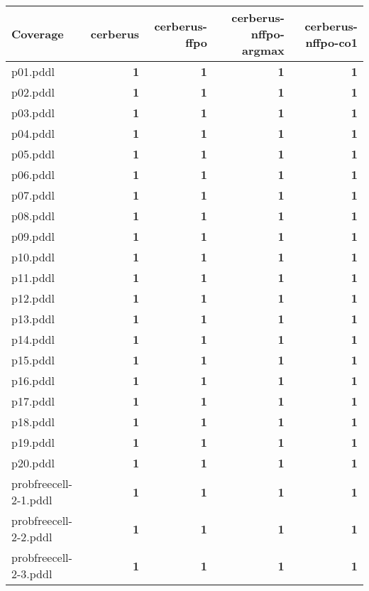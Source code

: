 \documentclass{article}
\begin{document}
\begin{tabular}{@{}lrrrr@{}}
Coverage & cerberus & cerberus-ffpo & cerberus-nffpo-argmax & cerberus-nffpo-co1 \\
\midrule
p01.pddl & \textbf{1} & \textbf{1} & \textbf{1} & \textbf{1} \\
p02.pddl & \textbf{1} & \textbf{1} & \textbf{1} & \textbf{1} \\
p03.pddl & \textbf{1} & \textbf{1} & \textbf{1} & \textbf{1} \\
p04.pddl & \textbf{1} & \textbf{1} & \textbf{1} & \textbf{1} \\
p05.pddl & \textbf{1} & \textbf{1} & \textbf{1} & \textbf{1} \\
p06.pddl & \textbf{1} & \textbf{1} & \textbf{1} & \textbf{1} \\
p07.pddl & \textbf{1} & \textbf{1} & \textbf{1} & \textbf{1} \\
p08.pddl & \textbf{1} & \textbf{1} & \textbf{1} & \textbf{1} \\
p09.pddl & \textbf{1} & \textbf{1} & \textbf{1} & \textbf{1} \\
p10.pddl & \textbf{1} & \textbf{1} & \textbf{1} & \textbf{1} \\
p11.pddl & \textbf{1} & \textbf{1} & \textbf{1} & \textbf{1} \\
p12.pddl & \textbf{1} & \textbf{1} & \textbf{1} & \textbf{1} \\
p13.pddl & \textbf{1} & \textbf{1} & \textbf{1} & \textbf{1} \\
p14.pddl & \textbf{1} & \textbf{1} & \textbf{1} & \textbf{1} \\
p15.pddl & \textbf{1} & \textbf{1} & \textbf{1} & \textbf{1} \\
p16.pddl & \textbf{1} & \textbf{1} & \textbf{1} & \textbf{1} \\
p17.pddl & \textbf{1} & \textbf{1} & \textbf{1} & \textbf{1} \\
p18.pddl & \textbf{1} & \textbf{1} & \textbf{1} & \textbf{1} \\
p19.pddl & \textbf{1} & \textbf{1} & \textbf{1} & \textbf{1} \\
p20.pddl & \textbf{1} & \textbf{1} & \textbf{1} & \textbf{1} \\
probfreecell-2-1.pddl & \textbf{1} & \textbf{1} & \textbf{1} & \textbf{1} \\
probfreecell-2-2.pddl & \textbf{1} & \textbf{1} & \textbf{1} & \textbf{1} \\
probfreecell-2-3.pddl & \textbf{1} & \textbf{1} & \textbf{1} & \textbf{1} \\

\end{tabular}
\end{document}
